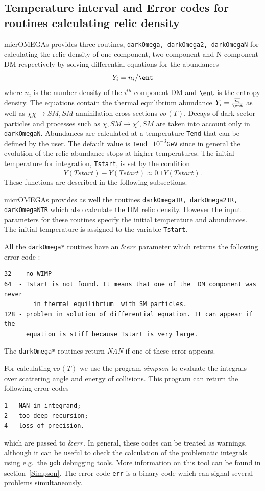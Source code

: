 \documentclass[12pt,a4paper]{article}
\begin{document}
\subsection{Temperature interval and  Error codes for routines calculating relic density} 
micrOMEGAs provides  three routines, { \tt darkOmega, darkOmega2, darkOmegaN} 
 for calculating the relic density of one-component, two-component and N-component DM respectively by solving 
differential equations for the abundances 
\begin{equation}
  Y_i=n_i/\ent 
  \end{equation}
where $n_i$ is the number density of the $i^{th}$-component  DM and $\ent$ is the entropy density. 
The equations
contain the  thermal equilibrium  abundance $\overline{Y_i}=\frac{\overline{n_i}}{\ent}$ as well as $\chi\chi\to SM,SM$
annihilation cross sections $v\sigma(T)$. Decays of dark sector particles and processes such as  $
\chi, SM\to \chi', SM$ are taken into account only in {\tt darkOmegaN}. Abundances are calculated   at a temperature {\tt Tend} that can be defined  by the user. The default value is 
{\tt Tend}=$10^{-3}${\tt GeV} since in general the  evolution of the relic abundance stops at higher
temperatures. The initial temperature for integration, {\tt Tstart}, is set  by the
condition 
$$ Y(Tstart)-\bar{Y}(Tstart) \approx 0.1 \bar{Y}(Tstart). $$
These functions are described in the following subsections.

micrOMEGAs provides as well the routines
{ \tt darkOmegaTR, darkOmega2TR, darkOmegaNTR}  which also calculate the  DM relic
density. However the input parameters for these routines specify
the  initial temperature and  abundances. The initial temperature is assigned to the
variable {\tt Tstart}. 

All the {\tt darkOmega*} routines have an $\&err$ parameter  which  returns the following error code :
 
\begin{verbatim}
32  - no WIMP
64  - Tstart is not found. It means that one of the  DM component was never 
        in thermal equilibrium  with SM particles.
128 - problem in solution of differential equation. It can appear if the
      equation is stiff because Tstart is very large.
\end{verbatim}  
The {\tt darkOmega*} routines return {\it NAN} if one of these error  appears.
  
For calculating $v\sigma(T)$ we use the program {\it simpson} to evaluate the
integrals over scattering angle and energy of collisions. This
program can return the following   error codes  
\begin{verbatim} 
1 - NAN in integrand;
2 - too deep recursion;
4 - loss of precision.
\end{verbatim}
which are  passed to $\&err$.
In general, these codes can be treated as warnings, although it can be useful to 
check the calculation of the problematic integrals using e.g.\ the {\tt gdb} debugging tools. 
More information on this tool can be found  in section~\ref{Simpson}. The error code {\tt err} is a binary code which can signal several problems simultaneously. 
\end{document}
